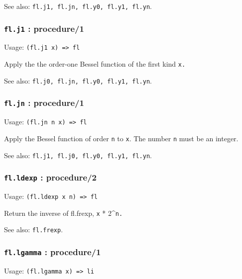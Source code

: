 \documentclass[
]{article}
\newcommand{\passthrough}[1]{#1}
\begin{document}
See also: \passthrough{\lstinline!fl.j1, fl.jn, fl.y0, fl.y1, fl.yn!}.

\hypertarget{fl.j1-procedure1}{%
\subsubsection{\texorpdfstring{\texttt{fl.j1} :
procedure/1}{fl.j1 : procedure/1}}\label{fl.j1-procedure1}}

Usage: \passthrough{\lstinline!(fl.j1 x) => fl!}

Apply the the order-one Bessel function of the first kind
\passthrough{\lstinline!x.!}

See also: \passthrough{\lstinline!fl.j0, fl.jn, fl.y0, fl.y1, fl.yn!}.

\hypertarget{fl.jn-procedure1}{%
\subsubsection{\texorpdfstring{\texttt{fl.jn} :
procedure/1}{fl.jn : procedure/1}}\label{fl.jn-procedure1}}

Usage: \passthrough{\lstinline!(fl.jn n x) => fl!}

Apply the Bessel function of order \passthrough{\lstinline!n!} to
\passthrough{\lstinline!x!}. The number \passthrough{\lstinline!n!} must
be an integer.

See also: \passthrough{\lstinline!fl.j1, fl.j0, fl.y0, fl.y1, fl.yn!}.

\hypertarget{fl.ldexp-procedure2}{%
\subsubsection{\texorpdfstring{\texttt{fl.ldexp} :
procedure/2}{fl.ldexp : procedure/2}}\label{fl.ldexp-procedure2}}

Usage: \passthrough{\lstinline!(fl.ldexp x n) => fl!}

Return the inverse of fl.frexp, \passthrough{\lstinline!x!} *
2\^{}\passthrough{\lstinline!n.!}

See also: \passthrough{\lstinline!fl.frexp!}.

\hypertarget{fl.lgamma-procedure1}{%
\subsubsection{\texorpdfstring{\texttt{fl.lgamma} :
procedure/1}{fl.lgamma : procedure/1}}\label{fl.lgamma-procedure1}}

Usage: \passthrough{\lstinline!(fl.lgamma x) => li!}
\end{document}
